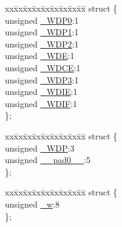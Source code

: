 \begin{DoxyCompactItemize}
\item 
\begin{tabbing}
xx\=xx\=xx\=xx\=xx\=xx\=xx\=xx\=xx\=\kill
struct \{\\
\>unsigned \hyperlink{union_____w_d_t_c_s_rbits__t_aecebde38eea725dc01757e9ed2e828db}{\_WDP0}:1\\
\>unsigned \hyperlink{union_____w_d_t_c_s_rbits__t_a8f89eeb3dba6840dd17deacdccaf43a0}{\_WDP1}:1\\
\>unsigned \hyperlink{union_____w_d_t_c_s_rbits__t_adaa88b095700be47bb573761bdcdd774}{\_WDP2}:1\\
\>unsigned \hyperlink{union_____w_d_t_c_s_rbits__t_a26fd056adee7c401d26d489f773c2226}{\_WDE}:1\\
\>unsigned \hyperlink{union_____w_d_t_c_s_rbits__t_af5726163696ae37be037c6fd05b82df9}{\_WDCE}:1\\
\>unsigned \hyperlink{union_____w_d_t_c_s_rbits__t_a214c1e1e7821e33b913f5d61b95a64a8}{\_WDP3}:1\\
\>unsigned \hyperlink{union_____w_d_t_c_s_rbits__t_affe9114b82ea964a894cbc2f8ed4e278}{\_WDIE}:1\\
\>unsigned \hyperlink{union_____w_d_t_c_s_rbits__t_a96306a462627b2393e8b3527461b47c7}{\_WDIF}:1\\
\}; \\

\end{tabbing}\item 
\begin{tabbing}
xx\=xx\=xx\=xx\=xx\=xx\=xx\=xx\=xx\=\kill
struct \{\\
\>unsigned \hyperlink{union_____w_d_t_c_s_rbits__t_a3d6145dfa2d7d823843f37d37ac54767}{\_WDP}:3\\
\>unsigned \hyperlink{union_____w_d_t_c_s_rbits__t_aadadaa08e9f975f9781fbb09618c0188}{\_\_pad0\_\_}:5\\
\}; \\

\end{tabbing}\item 
\begin{tabbing}
xx\=xx\=xx\=xx\=xx\=xx\=xx\=xx\=xx\=\kill
struct \{\\
\>unsigned \hyperlink{union_____w_d_t_c_s_rbits__t_ae5e9490ae3bbced4aa66938e374c05f2}{\_w}:8\\
\}; \\

\end{tabbing}\end{DoxyCompactItemize}


